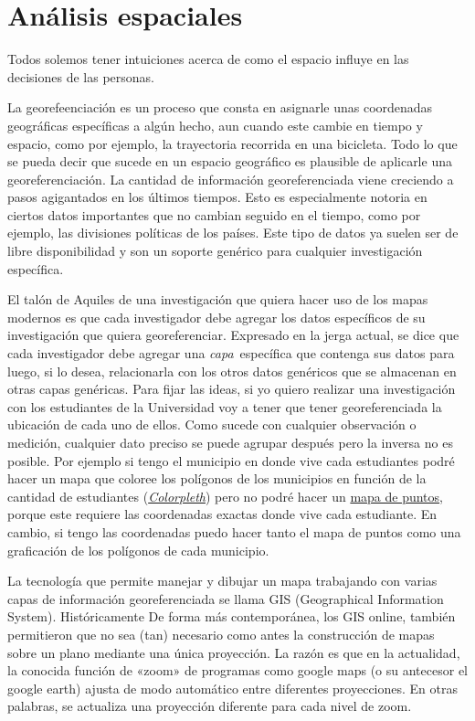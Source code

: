 \documentclass[
  letterpaper,
  DIV=11,
  numbers=noendperiod]{scrreprt}
\begin{document}
\hypertarget{anuxe1lisis-espaciales-1}{%
\section{Análisis espaciales}\label{anuxe1lisis-espaciales-1}}

Todos solemos tener intuiciones acerca de como el espacio influye en las
decisiones de las personas.

La georefeenciación es un proceso que consta en asignarle unas
coordenadas geográficas específicas a algún hecho, aun cuando este
cambie en tiempo y espacio, como por ejemplo, la trayectoria recorrida
en una bicicleta. Todo lo que se pueda decir que sucede en un espacio
geográfico es plausible de aplicarle una georeferenciación. La cantidad
de información georeferenciada viene creciendo a pasos agigantados en
los últimos tiempos. Esto es especialmente notoria en ciertos datos
importantes que no cambian seguido en el tiempo, como por ejemplo, las
divisiones políticas de los países. Este tipo de datos ya suelen ser de
libre disponibilidad y son un soporte genérico para cualquier
investigación específica.

El talón de Aquiles de una investigación que quiera hacer uso de los
mapas modernos es que cada investigador debe agregar los datos
específicos de su investigación que quiera georeferenciar. Expresado en
la jerga actual, se dice que cada investigador debe agregar una
\emph{capa}~específica que contenga sus datos para luego, si lo desea,
relacionarla con los otros datos genéricos que se almacenan en otras
capas genéricas. Para fijar las ideas, si yo quiero realizar una
investigación con los estudiantes de la Universidad voy a tener que
tener georeferenciada la ubicación de cada uno de ellos. Como sucede con
cualquier observación o medición, cualquier dato preciso se puede
agrupar después pero la inversa no es posible. Por ejemplo si tengo el
municipio en donde vive cada estudiantes podré hacer un mapa que coloree
los polígonos de los municipios en función de la cantidad de estudiantes
(\href{https://datavizcatalogue.com/ES/metodos/mapa_coropletico.html}{\emph{Colorpleth}})
pero no podré hacer un
\href{https://datavizcatalogue.com/ES/metodos/mapa_de_puntos.html}{mapa
de puntos}, porque este requiere las coordenadas exactas donde vive cada
estudiante. En cambio, si tengo las coordenadas puedo hacer tanto el
mapa de puntos como una graficación de los polígonos de cada municipio.

La tecnología que permite manejar y dibujar un mapa trabajando con
varias capas de información georeferenciada se llama GIS (Geographical
Information System). Históricamente De forma más contemporánea, los GIS
online, también permitieron que no sea (tan) necesario como antes la
construcción de mapas sobre un plano mediante una única proyección. La
razón es que en la actualidad, la conocida función de «zoom» de
programas como google maps (o su antecesor el google earth) ajusta de
modo automático entre diferentes proyecciones. En otras palabras, se
actualiza una proyección diferente para cada nivel de zoom.
\end{document}
